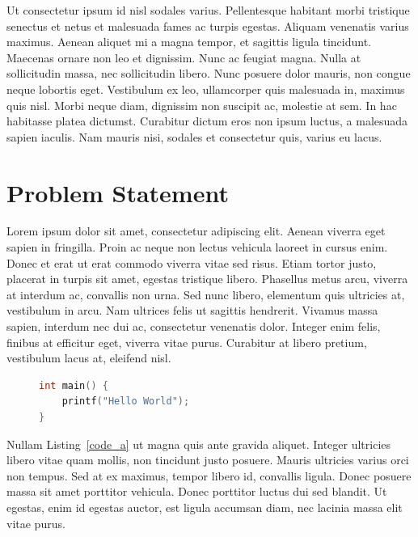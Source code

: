 Ut consectetur ipsum id nisl sodales varius. Pellentesque habitant morbi tristique senectus et netus et malesuada fames ac turpis egestas. Aliquam venenatis varius maximus. Aenean aliquet mi a magna tempor, et sagittis ligula tincidunt. Maecenas ornare non leo et dignissim. Nunc ac feugiat magna. Nulla at sollicitudin massa, nec sollicitudin libero. Nunc posuere dolor mauris, non congue neque lobortis eget. Vestibulum ex leo, ullamcorper quis malesuada in, maximus quis nisl. Morbi neque diam, dignissim non suscipit ac, molestie at sem. In hac habitasse platea dictumst. Curabitur dictum eros non ipsum luctus, a malesuada sapien iaculis. Nam mauris nisi, sodales et consectetur quis, varius eu lacus.


\section{Problem Statement}


Lorem ipsum dolor sit amet, consectetur adipiscing elit. Aenean viverra eget sapien in fringilla. Proin ac neque non lectus vehicula laoreet in cursus enim. Donec et erat ut erat commodo viverra vitae sed risus. Etiam tortor justo, placerat in turpis sit amet, egestas tristique libero. Phasellus metus arcu, viverra at interdum ac, convallis non urna. Sed nunc libero, elementum quis ultricies at, vestibulum in arcu. Nam ultrices felis ut sagittis hendrerit. Vivamus massa sapien, interdum nec dui ac, consectetur venenatis dolor. Integer enim felis, finibus at efficitur eget, viverra vitae purus. Curabitur at libero pretium, vestibulum lacus at, eleifend nisl.

\begin{figure}[tb]
\centering
\begin{minipage}[b]{0.90\textwidth}
    \begin{lstlisting}[language=C,captionpos=b,caption=This C snipped is important. Short description.,label=code_a]
int main() {
    printf("Hello World");
}
    \end{lstlisting}
\end{minipage}
\end{figure}

Nullam Listing~\ref{code_a} ut magna quis ante gravida aliquet. Integer ultricies libero vitae quam mollis, non tincidunt justo posuere. Mauris ultricies varius orci non tempus. Sed at ex maximus, tempor libero id, convallis ligula. Donec posuere massa sit amet porttitor vehicula. Donec porttitor luctus dui sed blandit. Ut egestas, enim id egestas auctor, est ligula accumsan diam, nec lacinia massa elit vitae purus.

